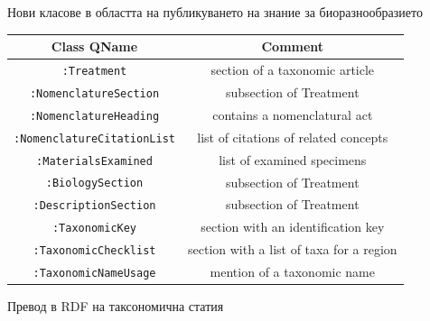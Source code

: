 \documentclass[bulgarian]{beamer}
\begin{document}
\begin{frame}{Нови класове в областта на публикуването на знание за биоразнообразието}

      \begin{tabular}{cc}
        \hline
          Class QName             & Comment\\  \hline
  {\tt :Treatment}                & section of a taxonomic article\\
  {\tt :NomenclatureSection}      & subsection of Treatment\\
  {\tt :NomenclatureHeading}      & contains a nomenclatural act \\
  {\tt :NomenclatureCitationList} & list of citations of related concepts\\
  {\tt :MaterialsExamined}        & list of examined specimens\\
  {\tt :BiologySection}           & subsection of Treatment\\
  {\tt :DescriptionSection}       & subsection of Treatment\\
  {\tt :TaxonomicKey}             & section with an identification key\\
  {\tt :TaxonomicChecklist}       & section with a list of taxa for a region\\ 
  {\tt :TaxonomicNameUsage}       & mention of a taxonomic name\\ \hline

      \end{tabular}
      
\end{frame}


\begin{frame}{Превод в RDF на таксономична статия}
\centering
{}
	
  
\end{frame}
\end{document}

